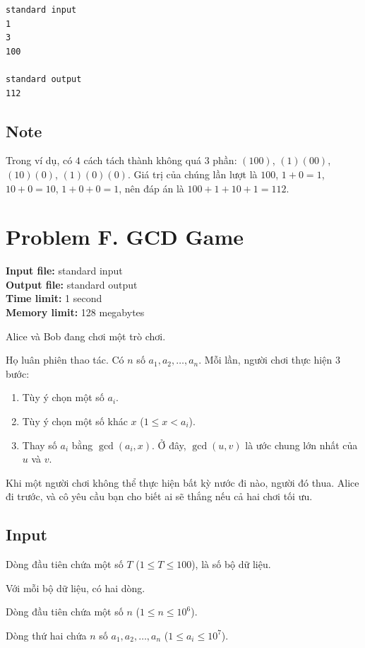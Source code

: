 \documentclass[11pt]{article}
\begin{document}
\begin{verbatim}
standard input
1
3
100

standard output
112
\end{verbatim}

\subsection*{Note}

Trong ví dụ, có $4$ cách tách thành không quá $3$ phần:
$(100)$, $(1)(00)$, $(10)(0)$, $(1)(0)(0)$. Giá trị của chúng lần lượt là
$100$, $1+0=1$, $10+0=10$, $1+0+0=1$, nên đáp án là
$100+1+10+1=112$.

\section{Problem F. GCD Game}

\noindent
\textbf{Input file:} standard input\\
\textbf{Output file:} standard output\\
\textbf{Time limit:} 1 second\\
\textbf{Memory limit:} 128 megabytes

Alice và Bob đang chơi một trò chơi.

Họ luân phiên thao tác. Có $n$ số $a_1,a_2,\ldots,a_n$. Mỗi lần, người chơi
thực hiện $3$ bước:
\begin{enumerate}
  \item Tùy ý chọn một số $a_i$.
  \item Tùy ý chọn một số khác $x$ ($1\le x<a_i$).
  \item Thay số $a_i$ bằng $\gcd(a_i,x)$. Ở đây, $\gcd(u,v)$ là ước chung
  lớn nhất của $u$ và $v$.
\end{enumerate}

Khi một người chơi không thể thực hiện bất kỳ nước đi nào, người đó thua.
Alice đi trước, và cô yêu cầu bạn cho biết ai sẽ thắng nếu cả hai chơi tối ưu.

\subsection*{Input}

Dòng đầu tiên chứa một số $T$ ($1\le T\le 100$), là số bộ dữ liệu.

Với mỗi bộ dữ liệu, có hai dòng.

Dòng đầu tiên chứa một số $n$ ($1\le n\le 10^6$).

Dòng thứ hai chứa $n$ số $a_1,a_2,\ldots,a_n$ ($1\le a_i\le 10^7$).
\end{document}
